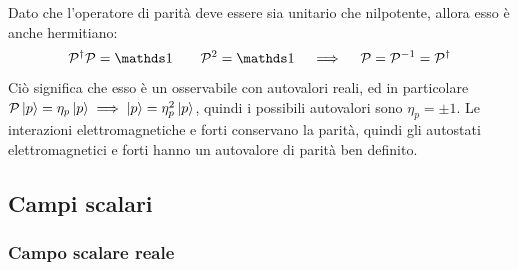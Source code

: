 Dato che l'operatore di parità deve essere sia unitario che nilpotente, allora esso è anche hermitiano:
\begin{equation*}
  \oppar\dg \oppar = \id
  \qquad
  \oppar^2 = \id
  \quad \implies \quad
  \oppar = \oppar^{-1} = \oppar\dg
\end{equation*}
Ciò significa che esso è un osservabile con autovalori reali, ed in particolare $ \mathcal{P} \ket{p} = \eta_p \ket{p} \implies \ket{p} = \eta_p^2 \ket{p} $, quindi i possibili autovalori sono $ \eta_p = \pm 1 $. Le interazioni elettromagnetiche e forti conservano la parità, quindi gli autostati elettromagnetici e forti hanno un autovalore di parità ben definito.

\subsection{Campi scalari}

\subsubsection{Campo scalare reale}

